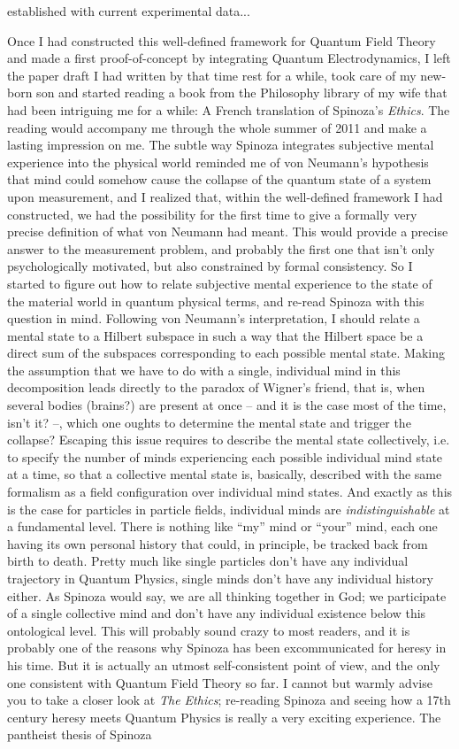 established with current experimental data...

Once I had constructed this well-defined framework for Quantum Field Theory and made a first proof-of-concept by integrating Quantum Electrodynamics, I left the paper draft I had written by that time rest for a while, took care of my new-born son and started reading a book from the Philosophy library of my wife that had been intriguing me for a while: A French translation of Spinoza's \textit{Ethics}. The reading would accompany me through the whole summer of 2011 and make a lasting impression on me. The subtle way Spinoza integrates subjective mental experience into the physical world reminded me of von Neumann's hypothesis that mind could somehow cause the collapse of the quantum state of a system upon measurement, and I realized that, within the well-defined framework I had constructed, we had the possibility for the first time to give a formally very precise definition of what von Neumann had meant. This would provide a precise answer to the measurement problem, and probably the first one that isn't only psychologically motivated, but also constrained by formal consistency. So I started to figure out how to relate subjective mental experience to the state of the material world in quantum physical terms, and re-read Spinoza with this question in mind. Following von Neumann's interpretation, I should relate a mental state to a Hilbert subspace in such a way that the Hilbert space be a direct sum of the subspaces corresponding to each possible mental state. Making the assumption that we have to do with a single, individual mind in this decomposition leads directly to the paradox of Wigner's friend, that is, when several bodies (brains?) are present at once -- and it is the case most of the time, isn't it? --, which one oughts to determine the mental state and trigger the collapse? Escaping this issue requires to describe the mental state collectively, i.e. to specify the number of minds experiencing each possible individual mind state at a time, so that a collective mental state is, basically, described with the same formalism as a field configuration over individual mind states. And exactly as this is the case for particles in particle fields, individual minds are \textit{indistinguishable} at a fundamental level. There is nothing like ``my'' mind or ``your'' mind, each one having its own personal history that could, in principle, be tracked back from birth to death. Pretty much like single particles don't have any individual trajectory in Quantum Physics, single minds don't have any individual history either. As Spinoza would say, we are all thinking together in God; we participate of a single collective mind and don't have any individual existence below this ontological level. This will probably sound crazy to most readers, and it is probably one of the reasons why Spinoza has been excommunicated for heresy in his time. But it is actually an utmost self-consistent point of view, and the only one consistent with Quantum Field Theory so far. I cannot but warmly advise you to take a closer look at \textit{The Ethics}; re-reading Spinoza and seeing how a 17th century heresy meets Quantum Physics is really a very exciting experience. The pantheist thesis of Spinoza 